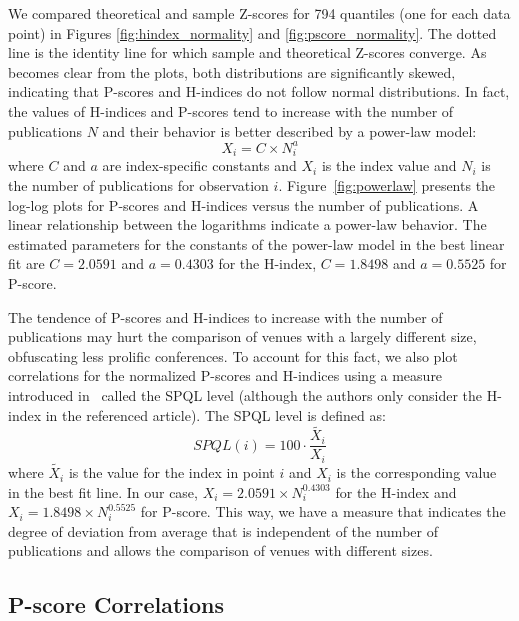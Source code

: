 \documentclass[notitlepage]{svjour3}
\begin{document}
We compared theoretical and sample Z-scores for 794 quantiles (one for each data point) in Figures
\ref{fig:hindex_normality} and \ref{fig:pscore_normality}. The dotted line is the identity line for
which sample and theoretical Z-scores converge. As becomes clear from the plots, both distributions
are significantly skewed, indicating that P-scores and H-indices do not follow normal distributions.
In fact, the values of H-indices and P-scores tend to increase with the number of publications $ N $ 
and their behavior is better described by a power-law model: 
%
\begin{equation}
X_i = C \times N_i^a
\end{equation}
%
where $ C $ and $ a $ are index-specific constants and $ X_i $ is the index value and $ N_i $ is the 
number of publications for observation $ i $. Figure~\ref{fig:powerlaw} presents the 
log-log plots for P-scores and H-indices versus the number of publications. A linear 
relationship between the logarithms indicate a power-law behavior. The estimated parameters
for the constants of the power-law model in the best linear fit are 
$ C = 2.0591 $ and $ a = 0.4303 $ for the H-index,
$ C = 1.8498 $ and $ a = 0.5525 $ for P-score.

The tendence of P-scores and H-indices to increase with the number of publications may hurt the comparison of venues 
with a largely different size, obfuscating less prolific conferences. To account for this fact, we also plot 
correlations for the normalized P-scores and H-indices using a measure introduced in~\cite{Babic2016}
called the SPQL level (although the authors only consider the H-index in the referenced article). 
The SPQL level is defined as:
%
\begin{equation}
SPQL(i) = 100 \cdot \frac{\tilde{X_i}}{X_i}
\end{equation}
%
where $ \tilde{X_i} $ is the value for the index in point $ i $ and $ X_i $ is the corresponding
value in the best fit line. In our case, 
$ X_i = 2.0591 \times N_i^{0.4303} $ for the H-index and 
$ X_i = 1.8498 \times N_i^{0.5525} $ for P-score.
This way, we have a measure that indicates
the degree of deviation from average that is independent of the number of publications and allows
the comparison of venues with different sizes.


\subsection{P-score Correlations}
\end{document}
